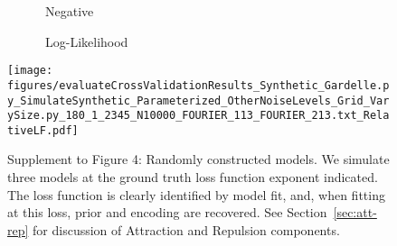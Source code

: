 \begin{figure}
\begin{minipage}[c]{0.8\linewidth}
\end{minipage}
\begin{minipage}[c]{0.19\linewidth}
\centering

\ \ \ \ \ \ Negative

\ \ \ \ \ \ Log-Likelihood


\texttt{[image: figures/evaluateCrossValidationResults\_Synthetic\_Gardelle.py\_SimulateSynthetic\_Parameterized\_OtherNoiseLevels\_Grid\_VarySize.py\_180\_1\_2345\_N10000\_FOURIER\_113\_FOURIER\_213.txt\_RelativeLF.pdf]}
\end{minipage}


\caption{Supplement to Figure 4: Randomly constructed models.
We simulate three models at the ground truth loss function exponent indicated.
The loss function is clearly identified by model fit, and, when fitting at this loss, prior and encoding are recovered.
See Section~\ref{sec:att-rep} for discussion of Attraction and Repulsion components.
}
\label{fig:fourier-1}
\end{figure}


